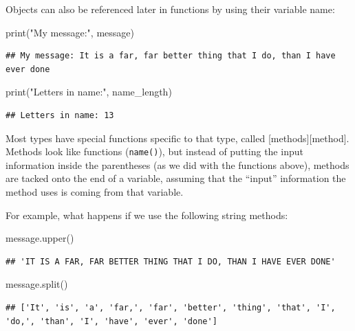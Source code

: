 \documentclass[]{Nemilov}
\newenvironment{Shaded}{\begin{snugshade}}{\end{snugshade}}
\newcommand{\BuiltInTok}[1]{#1}
\newcommand{\NormalTok}[1]{#1}
\newcommand{\StringTok}[1]{\textcolor[rgb]{0.31,0.60,0.02}{#1}}
\begin{document}
Objects can also be referenced later in functions by using their variable name:

\begin{Shaded}
\begin{Highlighting}[]
\BuiltInTok{print}\NormalTok{(}\StringTok{"My message:"}\NormalTok{, message)}
\end{Highlighting}
\end{Shaded}

\begin{verbatim}
## My message: It is a far, far better thing that I do, than I have ever done
\end{verbatim}

\begin{Shaded}
\begin{Highlighting}[]
\BuiltInTok{print}\NormalTok{(}\StringTok{"Letters in name:"}\NormalTok{, name_length)}
\end{Highlighting}
\end{Shaded}

\begin{verbatim}
## Letters in name: 13
\end{verbatim}

Most types have special functions specific to that type, called {[}methods{]}{[}method{]}.
Methods look like functions (\texttt{name()}), but instead
of putting the input information inside the parentheses (as we did with the
functions above), methods are tacked onto the end of a variable, assuming
that the ``input'' information the method uses is coming from that variable.

For example, what happens if we use the following string methods:

\begin{Shaded}
\begin{Highlighting}[]
\NormalTok{message.upper()}
\end{Highlighting}
\end{Shaded}

\begin{verbatim}
## 'IT IS A FAR, FAR BETTER THING THAT I DO, THAN I HAVE EVER DONE'
\end{verbatim}

\begin{Shaded}
\begin{Highlighting}[]
\NormalTok{message.split()}
\end{Highlighting}
\end{Shaded}

\begin{verbatim}
## ['It', 'is', 'a', 'far,', 'far', 'better', 'thing', 'that', 'I', 'do,', 'than', 'I', 'have', 'ever', 'done']
\end{verbatim}
\end{document}
